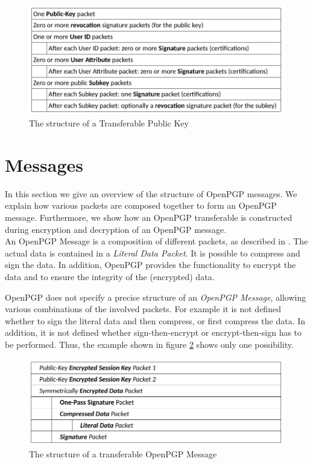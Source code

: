 \begin{figure}[h]
	\centering
	\includegraphics[width=1\linewidth]{figures/transferable-key.png}
	\caption{The structure of a Transferable Public Key}
	\label{fig:transferable-key}
\end{figure}

\section{Messages}
\label{section:messageformat:messages}

In this section we give an overview of the structure of OpenPGP messages. We explain how various packets are composed together to form an OpenPGP message. Furthermore, we show how an OpenPGP transferable is constructed during encryption and decryption of an OpenPGP message. \\

An OpenPGP Message is a composition of different packets, as described in \cite[section 11.3]{RFC4880}. The actual data is contained in a \textit{Literal Data Packet}. It is possible to compress and sign the data. In addition, OpenPGP provides the functionality to encrypt the data and to ensure the integrity of the (encrypted) data.

OpenPGP does not specify a precise structure of an \textit{OpenPGP Message}, allowing various combinations of the involved packets. For example it is not defined whether to sign the literal data and then compress, or first compress the data. In addition, it is not defined whether sign-then-encrypt or encrypt-then-sign has to be performed. Thus, the example shown in figure \ref{fig:transferable-msg} shows only one possibility.

\begin{figure}[h!]
	\centering
	\includegraphics[width=1\linewidth]{figures/transferable-msg.png}
	\caption{The structure of a transferable OpenPGP Message}
	\label{fig:transferable-msg}
\end{figure}



